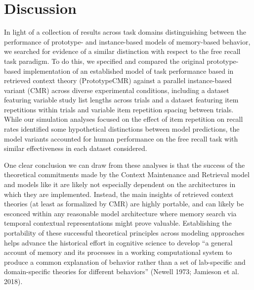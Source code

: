 \documentclass[
  letterpaper,
  DIV=11]{article}
\begin{document}
\hypertarget{discussion}{%
\section{Discussion}\label{discussion}}

In light of a collection of results across task domains distinguishing
between the performance of prototype- and instance-based models of
memory-based behavior, we searched for evidence of a similar distinction
with respect to the free recall task paradigm. To do this, we specified
and compared the original prototype-based implementation of an
established model of task performance based in retrieved context theory
(PrototypeCMR) against a parallel instance-based variant (CMR) across
diverse experimental conditions, including a dataset featuring variable
study list lengths across trials and a dataset featuring item
repetitions within trials and variable item repetition spacing between
trials. While our simulation analyses focused on the effect of item
repetition on recall rates identified some hypothetical distinctions
between model predictions, the model variants accounted for human
performance on the free recall task with similar effectiveness in each
dataset considered.

One clear conclusion we can draw from these analyses is that the success
of the theoretical commitments made by the Context Maintenance and
Retrieval model and models like it are likely not especially dependent
on the architectures in which they are implemented. Instead, the main
insights of retrieved context theories (at least as formalized by CMR)
are highly portable, and can likely be esconced within any reasonable
model architecture where memory search via temporal contextual
representations might prove valuable. Establishing the portability of
these successful theoretical principles across modeling approaches helps
advance the historical effort in cognitive science to develop ``a
general account of memory and its processes in a working computational
system to produce a common explanation of behavior rather than a set of
lab-specific and domain-specific theories for different behaviors''
(Newell 1973; Jamieson et al. 2018).
\end{document}
